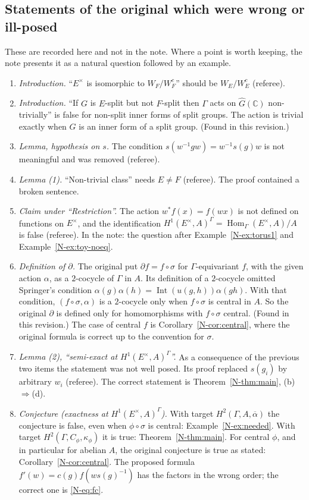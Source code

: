 \documentclass[12pt,letterpaper]{article}
\newcommand{\C}{\mathbb{C}}
\DeclareMathOperator{\Hom}{Hom}
\DeclareMathOperator{\Int}{Int}
\begin{document}
\subsection{Statements of the original which were wrong or ill-posed}

These are recorded here and not in the note. Where a point is worth
keeping, the note presents it as a natural question followed by an
example.

\begin{enumerate}[itemsep=2pt]
\item \emph{Introduction.} ``$E^\times$ is isomorphic to $W_F/W_F^c$''
  should be $W_E/W_E^c$ (referee).
\item \emph{Introduction.} ``If $G$ is $E$-split but not $F$-split then
  $\Gamma$ acts on $\widehat{G}(\C)$ non-trivially'' is false for
  non-split inner forms of split groups. The action is trivial exactly
  when $G$ is an inner form of a split group. (Found in this revision.)
\item \emph{Lemma, hypothesis on $s$.} The condition
  $s(w^{-1}gw)=w^{-1}s(g)w$ is not meaningful and was removed (referee).
\item \emph{Lemma (1).} ``Non-trivial class'' needs $E\neq F$ (referee).
  The proof contained a broken sentence.
\item \emph{Claim under ``Restriction''.} The action $w^*f(x)=f(wx)$ is
  not defined on functions on $E^\times$, and the identification
  $H^1(E^\times,A)^\Gamma=\Hom_\Gamma(E^\times,A)/A$ is false (referee).
  In the note: the question after Example~\ref{N-ex:torus1} and
  Example~\ref{N-ex:toy-noeq}.
\item \emph{Definition of $\partial$.} The original put
  $\partial f=f\circ\sigma$ for $\Gamma$-equivariant $f$, with the given
  action $\alpha$, as a $2$-cocycle of $\Gamma$ in $A$. Its definition of
  a $2$-cocycle omitted Springer's condition
  $\alpha(g)\alpha(h)=\Int(u(g,h))\alpha(gh)$. With that condition,
  $(f\circ\sigma,\alpha)$ is a $2$-cocycle only when $f\circ\sigma$ is
  central in $A$. So the original $\partial$ is defined only for
  homomorphisms with $f\circ\sigma$ central. (Found in this revision.) The
  case of central $f$ is Corollary~\ref{N-cor:central}, where the original
  formula is correct up to the convention for $\sigma$.
\item \emph{Lemma (2), ``semi-exact at $H^1(E^\times,A)^\Gamma$''.} As a
  consequence of the previous two items the statement was not well posed.
  Its proof replaced $s(g_i)$ by arbitrary $w_i$ (referee). The correct
  statement is Theorem~\ref{N-thm:main}, (b)$\Rightarrow$(d).
\item \emph{Conjecture (exactness at $H^1(E^\times,A)^\Gamma$).} With
  target $H^2(\Gamma,A,\overline{\alpha})$ the conjecture is false, even
  when $\phi\circ\sigma$ is central: Example~\ref{N-ex:needed}. With
  target $H^2(\Gamma,C_\phi,\kappa_\phi)$ it is true:
  Theorem~\ref{N-thm:main}. For central $\phi$, and in particular for
  abelian $A$, the original conjecture is true as stated:
  Corollary~\ref{N-cor:central}. The proposed formula
  $f'(w)=c(g)f(ws(g)^{-1})$ has the factors in the wrong order; the
  correct one is \eqref{N-eq:fc}.
\end{enumerate}
\end{document}
